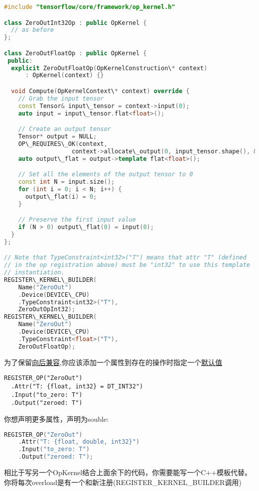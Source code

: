 \begin{lstlisting}[language=C++]
#include "tensorflow/core/framework/op_kernel.h"

class ZeroOutInt32Op : public OpKernel {
  // as before
};

class ZeroOutFloatOp : public OpKernel {
 public:
  explicit ZeroOutFloatOp(OpKernelConstruction\* context)
      : OpKernel(context) {}

  void Compute(OpKernelContext\* context) override {
    // Grab the input tensor
    const Tensor& input\_tensor = context->input(0);
    auto input = input\_tensor.flat<float>();

    // Create an output tensor
    Tensor* output = NULL;
    OP\_REQUIRES\_OK(context,
                   context->allocate\_output(0, input_tensor.shape(), &output));
    auto output\_flat = output->template flat<float>();

    // Set all the elements of the output tensor to 0
    const int N = input.size();
    for (int i = 0; i < N; i++) {
      output\_flat(i) = 0;
    }

    // Preserve the first input value
    if (N > 0) output\_flat(0) = input(0);
  }
};

// Note that TypeConstraint<int32>("T") means that attr "T" (defined
// in the op registration above) must be "int32" to use this template
// instantiation.
REGISTER\_KERNEL\_BUILDER(
    Name("ZeroOut")
    .Device(DEVICE\_CPU)
    .TypeConstraint<int32>("T"),
    ZeroOutOpInt32);
REGISTER\_KERNEL\_BUILDER(
    Name("ZeroOut")
    .Device(DEVICE\_CPU)
    .TypeConstraint<float>("T"),
    ZeroOutFloatOp);

\end{lstlisting}
为了保留\href{https://www.tensorflow.org/extend/adding_an_op?hl=zh-cn#backwards_compatibility}{向后兼容},你应该添加一个属性到存在的操作时指定一个\href{https://www.tensorflow.org/extend/adding_an_op?hl=zh-cn#default_values_constraints}{默认值}
\begin{lstlisting}
REGISTER_OP("ZeroOut")
  .Attr("T: {float, int32} = DT_INT32")
  .Input("to_zero: T")
  .Output("zeroed: T")

\end{lstlisting}
你想声明更多属性，声明为souble:
\begin{lstlisting}[language=C++]
REGISTER_OP("ZeroOut")
    .Attr("T: {float, double, int32}")
    .Input("to_zero: T")
    .Output("zeroed: T");

\end{lstlisting}
相比于写另一个OpKernel结合上面余下的代码，你需要能写一个C++模板代替。你将每次overload是有一个和新注册(REGISTER\_KERNEL\_BUILDER调用)

